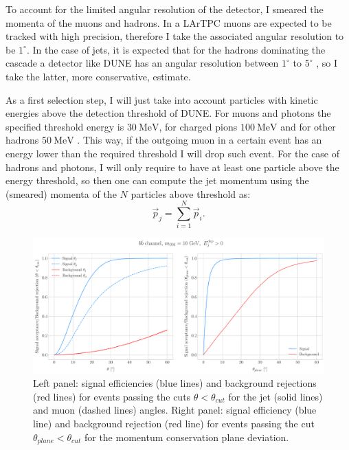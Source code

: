 To account for the limited angular resolution of the detector, I smeared the momenta of the muons and hadrons. In a LArTPC muons are expected to be tracked with high precision, therefore I take the associated angular resolution to be $1^{\circ}$. In the case of jets, it is expected that for the hadrons dominating the cascade a detector like DUNE has an angular resolution between $1^{\circ}$ to $5^{\circ}$ \cite{DUNE2020TDR2}, so I take the latter, more conservative, estimate.

As a first selection step, I will just take into account particles with kinetic energies above the detection threshold of DUNE. For muons and photons the specified threshold energy is $30 \ \mathrm{MeV}$, for charged pions $100 \ \mathrm{MeV}$ and for other hadrons $50 \ \mathrm{MeV}$ \cite{DUNE2020TDR2}. This way, if the outgoing muon in a certain event has an energy lower than the required threshold I will drop such event. For the case of hadrons and photons, I will only require to have at least one particle above the energy threshold, so then one can compute the jet momentum using the (smeared) momenta of the $N$ particles above threshold as:
\begin{equation}
	\vec{p}_{j} = \sum_{i=1}^{N} \vec{p}_{i}.
\end{equation}

\begin{figure}[t]
	\centering
	\includegraphics[width=0.95\linewidth]{Images/DM_Analysis/solardm_bb_100_dis_angular_cuts.pdf}
	\caption[Signal efficiency and background rejection for the $b\bar{b}$ sample with $m_{\mathrm{DM}} = 10 \ \mathrm{GeV}$ as a function of the angular cuts.]{Left panel: signal efficiencies (blue lines) and background rejections (red lines) for events passing the cuts $\theta < \theta_{cut}$ for the jet (solid lines) and muon (dashed lines) angles. Right panel: signal efficiency (blue line) and background rejection (red line) for events passing the cut $\theta_{plane} < \theta_{cut}$ for the momentum conservation plane deviation.}
	\label{fig:solardm_bb_100_dis_angular_cuts}
\end{figure}

